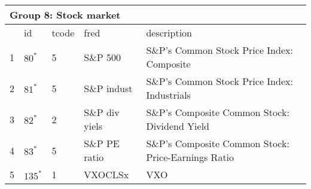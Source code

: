 \begin{table}[ht] 
\centering 
\begin{tabular}{lllll}
\multicolumn{5}{l}{Group 8: Stock market} \\
\toprule
 & id & tcode & fred & description \\
\midrule
1 & $80^*$ & 5 & S\&P 500 & S\&P's Common Stock Price Index: Composite \\
2 & $81^*$ & 5 & S\&P indust & S\&P's Common Stock Price Index: Industrials \\
3 & $82^*$ & 2 & S\&P div yiels & S\&P's Composite Common Stock: Dividend Yield \\
4 & $83^*$ & 5 & S\&P PE ratio & S\&P's Composite Common Stock: Price-Earnings Ratio \\
\rowcolor{lightgray} 5 & $135^*$ & 1 & VXOCLSx & VXO \\
\bottomrule
\end{tabular}  
\end{table} 